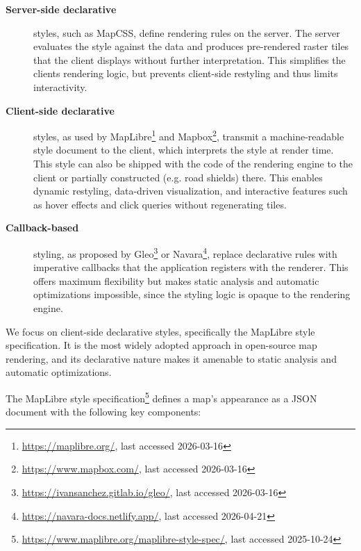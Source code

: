 \begin{description}
    \item[\textbf{Server-side declarative}] styles, such as MapCSS, define rendering rules on the server.
    The server evaluates the style against the data and produces pre-rendered raster tiles that the client displays without further interpretation.
    This simplifies the clients rendering logic, but prevents client-side restyling and thus limits interactivity.

    \item[\textbf{Client-side declarative}] \begin{sloppypar} styles, as used by MapLibre\footnote{\url{https://maplibre.org/}, last accessed 2026-03-16} and Mapbox\footnote{\url{https://www.mapbox.com/}, last accessed 2026-03-16}, transmit a machine-readable style document to the client, which interprets the style at render time.
    This style can also be shipped with the code of the rendering engine to the client or partially constructed (e.g. road shields) there.
    This enables dynamic restyling, data-driven visualization, and interactive features such as hover effects and click queries without regenerating tiles.\end{sloppypar}

    \item[\textbf{Callback-based}] styling, as proposed by Gleo\footnote{\url{https://ivansanchez.gitlab.io/gleo/}, last accessed 2026-03-16} or Navara\footnote{\url{https://navara-docs.netlify.app/}, last accessed 2026-04-21}, replace declarative rules with imperative callbacks that the application registers with the renderer.
    This offers maximum flexibility but makes static analysis and automatic optimizations impossible, since the styling logic is opaque to the rendering engine.
\end{description}

We focus on client-side declarative styles, specifically the MapLibre style specification.
It is the most widely adopted approach in open-source map rendering, and its declarative nature makes it amenable to static analysis and automatic optimizations.

The MapLibre style specification\footnote{\url{https://www.maplibre.org/maplibre-style-spec/}, last accessed 2025-10-24} defines a map's appearance as a \ac{JSON} document with the following key components:

